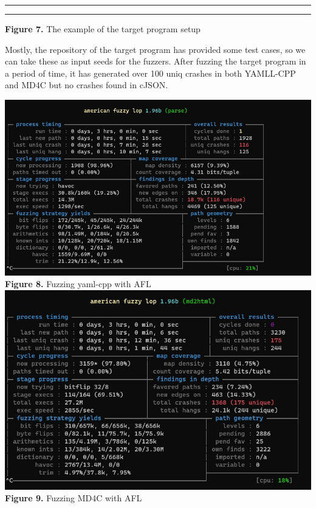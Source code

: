 \documentclass[12pt]{diazessay}
\begin{document}
\vspace{10mm}
\hrule height 0.4mm
\begingroup \fontsize{12pt}{12pt} \selectfont \begin{alltt}

\end{alltt} \vspace{-6mm} \endgroup \hrule height 0.4mm
\vspace{6mm}
\centerline{\textbf{Figure 7.} The example of the target program setup}
\vspace{6mm}

Mostly, the repository of the target program has provided some test cases, so we can take these as input seeds for the fuzzers.
After fuzzing the target program in a period of time, it has generated over 100 uniq crashes in both YAMLL-CPP and MD4C but no crashes found in cJSON. 
\vspace{1mm}
\begin{center}
	\includegraphics[scale=0.55, trim={0 0 7mm 0}, clip]{afl_yaml_cpp_3hrs.jpg}\\
	\textbf{Figure 8.} Fuzzing yaml-cpp with AFL\\
\vspace{1mm}
	\includegraphics[scale=0.55, trim={0 0 5mm 0}, clip]{afl_m2d4_3hrs.jpg}\\
	\textbf{Figure 9.} Fuzzing MD4C with AFL\\
\end{center}
\vspace{6mm}
\end{document}
